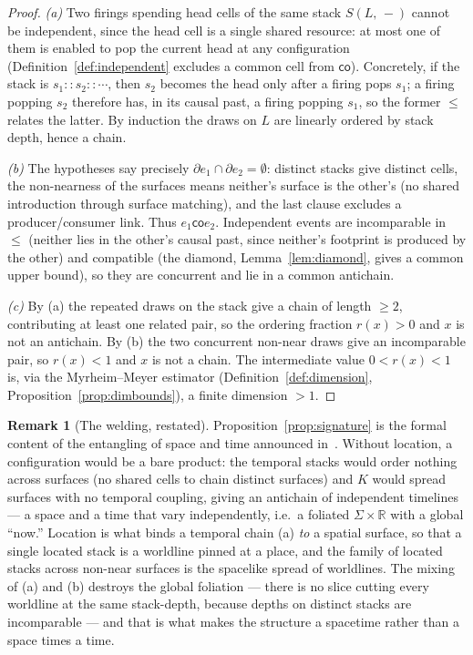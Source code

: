 \documentclass[11pt]{article}
\theoremstyle{definition}
\newtheorem{remark}[definition]{Remark}
\theoremstyle{plain}
\newcommand{\lstk}[2]{S(#1,\, #2)}     %
\newcommand{\cons}{\mathbin{::}}        %
\newcommand{\foot}{\partial}                       %
\newcommand{\co}{\mathbin{\mathsf{co}}}            %
\theoremstyle{remark}
\begin{document}
\begin{proof}
\emph{(a)} Two firings spending head cells of the same stack
$\lstk{L}{-}$ cannot be independent, since the head cell is a single
shared resource: at most one of them is enabled to pop the current head
at any configuration (Definition~\ref{def:independent} excludes a common
cell from $\co$). Concretely, if the stack is
$s_1 \cons s_2 \cons \cdots$, then $s_2$ becomes the head only after a
firing pops $s_1$; a firing popping $s_2$ therefore has, in its causal
past, a firing popping $s_1$, so the former $\le$ relates the latter. By
induction the draws on $L$ are linearly ordered by stack depth, hence a
chain.

\emph{(b)} The hypotheses say precisely $\foot{e_1} \cap \foot{e_2} =
\emptyset$: distinct stacks give distinct cells, the non-nearness of the
surfaces means neither's surface is the other's (no shared introduction
through surface matching), and the last clause excludes a
producer/consumer link. Thus $e_1 \co e_2$. Independent events are
incomparable in $\le$ (neither lies in the other's causal past, since
neither's footprint is produced by the other) and compatible (the
diamond, Lemma~\ref{lem:diamond}, gives a common upper bound), so they
are concurrent and lie in a common antichain.

\emph{(c)} By (a) the repeated draws on the stack give a chain of
length $\ge 2$, contributing at least one related pair, so the ordering
fraction $r(x) > 0$ and $x$ is not an antichain. By (b) the two
concurrent non-near draws give an incomparable pair, so $r(x) < 1$ and
$x$ is not a chain. The intermediate value $0 < r(x) < 1$ is, via the
Myrheim--Meyer estimator (Definition~\ref{def:dimension},
Proposition~\ref{prop:dimbounds}), a finite dimension $> 1$.
\end{proof}

\begin{remark}[The welding, restated]
Proposition~\ref{prop:signature} is the formal content of the entangling
of space and time announced in~\cite{CostNote}. Without location, a
configuration would be a bare product: the temporal stacks would order
nothing across surfaces (no shared cells to chain distinct surfaces) and
$K$ would spread surfaces with no temporal coupling, giving an antichain
of independent timelines --- a space and a time that vary independently,
i.e.\ a foliated $\Sigma \times \mathbb{R}$ with a global ``now.''
Location is what binds a temporal chain (a) \emph{to} a spatial surface,
so that a single located stack is a worldline pinned at a place, and the
family of located stacks across non-near surfaces is the spacelike
spread of worldlines. The mixing of (a) and (b) destroys the global
foliation --- there is no slice cutting every worldline at the same
stack-depth, because depths on distinct stacks are incomparable --- and
that is what makes the structure a spacetime rather than a space times a
time.
\end{remark}
\end{document}
